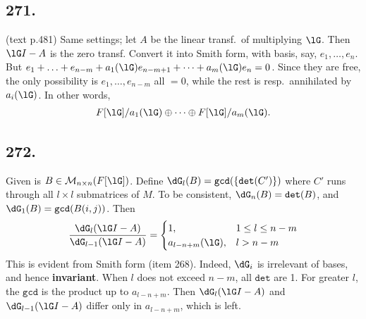 \documentclass[12pt]{article}
\newcommand{\F}\frac%
\newcommand{\X}\times%
\newcommand{\CF}[1]{ \mathcal{#1} }%
\newcommand{\Ss}[1]{\textsf{\bfseries{#1}}}%
\newcommand{\Tw}[1]{\texttt{#1}}%
\newcommand{\EqGo}[1]{ \begin{gather*}{#1}\end{gather*} } %
\begin{document}
\subsection*{271.} (text p.481) Same settings; let \(A\) be the linear transf.\ of multiplying \(\lG\). 
Then \(\lG I -A\) is the zero transf. 
Convert it into Smith form, with basis, say, \(e_1,\dotsc,e_n\). 
But \(e_1 +\dotsc +e_{n-m} +a_1(\lG) e_{n-m+1} +\dotsb +a_m(\lG) e_n =0\). 
Since they are free, the only possibility is \(e_1,\dotsc,e_{n-m}\) all \(=0\), while the rest is resp.\ annihilated by \(a_i(\lG)\). 
In other words, \EqGo{
 F[\lG]/a_1(\lG) \oplus\dotsb\oplus F[\lG]/a_m(\lG).
}

\subsection*{272.} Given is \(B \in \CF{M}_{n \X n}(F[\lG])\). 
Define \(\dG_l(B) =\Tw{gcd}(\{\Tw{det}(C')\})\) where \(C'\) runs through all \(l \X l\) submatrices of \(M\). 
To be consistent, \(\dG_n(B) =\Tw{det}(B)\), and \(\dG_1(B) =\Tw{gcd}(B(i,j))\). 
Then \begin{gather*}
 \F{\dG_l(\lG I -A)}{\dG_{l-1}(\lG I -A)}
 =\begin{cases} 1, &1 \leq l \leq n-m \\
 a_{l-n+m}(\lG), &l >n-m \end{cases}
\end{gather*} This is evident from Smith form (item 268). Indeed, \(\dG_i\) is irrelevant of bases, and hence \Ss{invariant}. 
When \(l\) does not exceed \(n-m\), all \(\Tw{det}\) are 1. 
For greater \(l\), the \(\Tw{gcd}\) is the product up to \(a_{l-n+m}\). 
Then \(\dG_l(\lG I -A)\) and \(\dG_{l-1}(\lG I -A)\) differ only in \(a_{l-n+m}\), which is left. 
\end{document}

